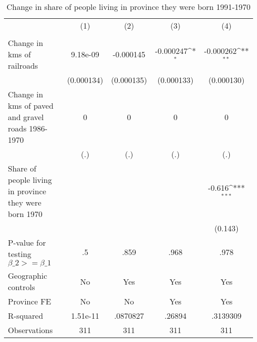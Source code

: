 \begin{table}[htbp]\centering
\def\sym#1{\ifmmode^{#1}\else\(^{#1}\)\fi}
\caption{Change in share of people living in province they were born 1991-1970}
\begin{tabular}{l*{4}{c}}
\hline\hline
                &\multicolumn{1}{c}{(1)}&\multicolumn{1}{c}{(2)}&\multicolumn{1}{c}{(3)}&\multicolumn{1}{c}{(4)}\\
                &\multicolumn{1}{c}{}&\multicolumn{1}{c}{}&\multicolumn{1}{c}{}&\multicolumn{1}{c}{}\\
\hline
Change in kms of railroads& 9.18e-09         &-0.000145         &-0.000247\sym{*}  &-0.000262\sym{**} \\
                &(0.000134)         &(0.000135)         &(0.000133)         &(0.000130)         \\
[1em]
Change in kms of paved and gravel roads 1986-1970&        0         &        0         &        0         &        0         \\
                &      (.)         &      (.)         &      (.)         &      (.)         \\
[1em]
Share of people living in province they were born 1970&                  &                  &                  &   -0.616\sym{***}\\
                &                  &                  &                  &  (0.143)         \\
\hline
P-value for testing $\beta\_{2} >= \beta\_{1}$&       .5         &     .859         &     .968         &     .978         \\
Geographic controls&       No         &      Yes         &      Yes         &      Yes         \\
Province FE     &       No         &       No         &      Yes         &      Yes         \\
R-squared       & 1.51e-11         & .0870827         &   .26894         & .3139309         \\
Observations    &      311         &      311         &      311         &      311         \\
\hline\hline
\end{tabular}
\end{table}

